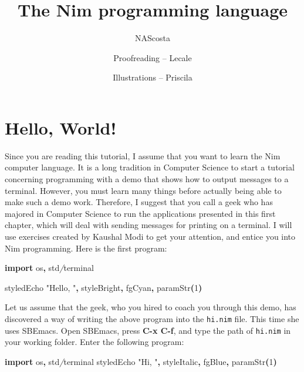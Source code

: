\documentclass[
  12pt,
]{book}
\title{The Nim programming language}
\author{NAScosta \and Proofreading -- Lecale \and Illustrations --
Priscila}
\date{}
\newenvironment{Shaded}{}{}
\newcommand{\CommentTok}[1]{\textcolor[rgb]{0.38,0.63,0.69}{\textit{#1}}}
\newcommand{\DataTypeTok}[1]{\textcolor[rgb]{0.56,0.13,0.00}{#1}}
\newcommand{\DecValTok}[1]{\textcolor[rgb]{0.25,0.63,0.44}{#1}}
\newcommand{\KeywordTok}[1]{\textcolor[rgb]{0.00,0.44,0.13}{\textbf{#1}}}
\newcommand{\NormalTok}[1]{#1}
\newcommand{\StringTok}[1]{\textcolor[rgb]{0.25,0.44,0.63}{#1}}
\begin{document}
\frontmatter
\maketitle

\mainmatter
\usetikzlibrary{backgrounds, positioning, %
                     snakes, fit,       %
                   3d,  arrows, automata, shapes.gates.logic.US,
                   shapes.gates.logic.IEC, calc, 
                    circuits.logic.US}

\mainmatter

\chapter{Hello, World!}\label{hello-world}

Since you are reading this tutorial, I assume that you want to learn the
Nim computer language. It is a long tradition in Computer Science to
start a tutorial concerning programming with a demo that shows how to
output messages to a terminal. However, you must learn many things
before actually being able to make such a demo work. Therefore, I
suggest that you call a geek who has majored in Computer Science to run
the applications presented in this first chapter, which will deal with
sending messages for printing on a terminal. I will use exercises
created by Kaushal Modi to get your attention, and entice you into Nim
programming. Here is the first program:

\begin{Shaded}
\begin{Highlighting}[]
\KeywordTok{import}\NormalTok{ os}\KeywordTok{,}\NormalTok{ std}\CommentTok{/}\NormalTok{terminal}

\DataTypeTok{styledEcho } \StringTok{"Hello, "}\KeywordTok{,}\NormalTok{ styleBright}\KeywordTok{,}\NormalTok{ fgCyan}\KeywordTok{,} \DataTypeTok{paramStr}\KeywordTok{(}\DecValTok{1}\KeywordTok{)}
\end{Highlighting}
\end{Shaded}

Let us assume that the geek, who you hired to coach you through this
demo, has discovered a way of writing the above program into the
\texttt{hi.nim} file. This time she uses SBEmacs. Open SBEmacs, press
\textbf{C-x C-f}, and type the path of \texttt{hi.nim} in your working
folder. Enter the following program:

\begin{Shaded}
\begin{Highlighting}[]
\KeywordTok{import}\NormalTok{ os}\KeywordTok{,}\NormalTok{ std}\CommentTok{/}\NormalTok{terminal}
\DataTypeTok{styledEcho} \StringTok{"Hi, "}\KeywordTok{,}\NormalTok{ styleItalic}\KeywordTok{,}\NormalTok{ fgBlue}\KeywordTok{,} \DataTypeTok{paramStr}\KeywordTok{(}\DecValTok{1}\KeywordTok{)}
\end{Highlighting}
\end{Shaded}
\end{document}
